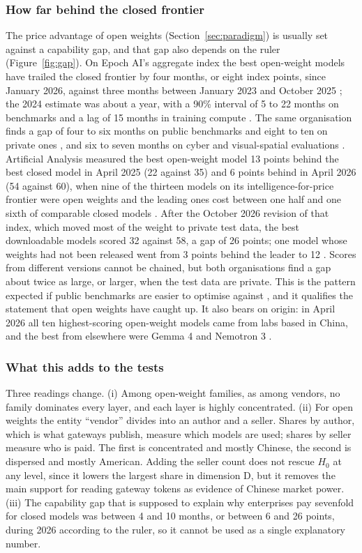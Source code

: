 \documentclass[11pt]{article}
\newcommand{\Hzero}{H_{0}}
\begin{document}
\subsubsection{How far behind the closed frontier} The price advantage of open weights (Section~\ref{sec:paradigm}) is usually set against a capability gap, and that gap also depends on the ruler (Figure~\ref{fig:gap}). On Epoch AI's aggregate index the best open-weight models have trailed the closed frontier by four months, or eight index points, since January 2026, against three months between January 2023 and October 2025 \cite{epoch2026gap}; the 2024 estimate was about a year, with a 90\% interval of 5 to 22 months on benchmarks and a lag of 15 months in training compute \cite{cottier2024far}. The same organisation finds a gap of four to six months on public benchmarks and eight to ten on private ones \cite{epoch2026thread}, and six to seven months on cyber and visual-spatial evaluations \cite{epoch2026topics}. Artificial Analysis measured the best open-weight model 13 points behind the best closed model in April 2025 (22 against 35) and 6 points behind in April 2026 (54 against 60), when nine of the thirteen models on its intelligence-for-price frontier were open weights and the leading ones cost between one half and one sixth of comparable closed models \cite{aa2026open}. After the October 2026 revision of that index, which moved most of the weight to private test data, the best downloadable models scored 32 against 58, a gap of 26 points; one model whose weights had not been released went from 3 points behind the leader to 12 \cite{implicator2026index}. Scores from different versions cannot be chained, but both organisations find a gap about twice as large, or larger, when the test data are private. This is the pattern expected if public benchmarks are easier to optimise against \cite{bean2025measuring}, and it qualifies the statement that open weights have caught up. It also bears on origin: in April 2026 all ten highest-scoring open-weight models came from labs based in China, and the best from elsewhere were Gemma 4 and Nemotron 3 \cite{aa2026open}.

\subsubsection{What this adds to the tests} Three readings change. (i) Among open-weight families, as among vendors, no family dominates every layer, and each layer is highly concentrated. (ii) For open weights the entity ``vendor'' divides into an author and a seller. Shares by author, which is what gateways publish, measure which models are used; shares by seller measure who is paid. The first is concentrated and mostly Chinese, the second is dispersed and mostly American. Adding the seller count does not rescue $\Hzero$ at any level, since it lowers the largest share in dimension D, but it removes the main support for reading gateway tokens as evidence of Chinese market power. (iii) The capability gap that is supposed to explain why enterprises pay sevenfold for closed models was between 4 and 10 months, or between 6 and 26 points, during 2026 according to the ruler, so it cannot be used as a single explanatory number.
\end{document}
